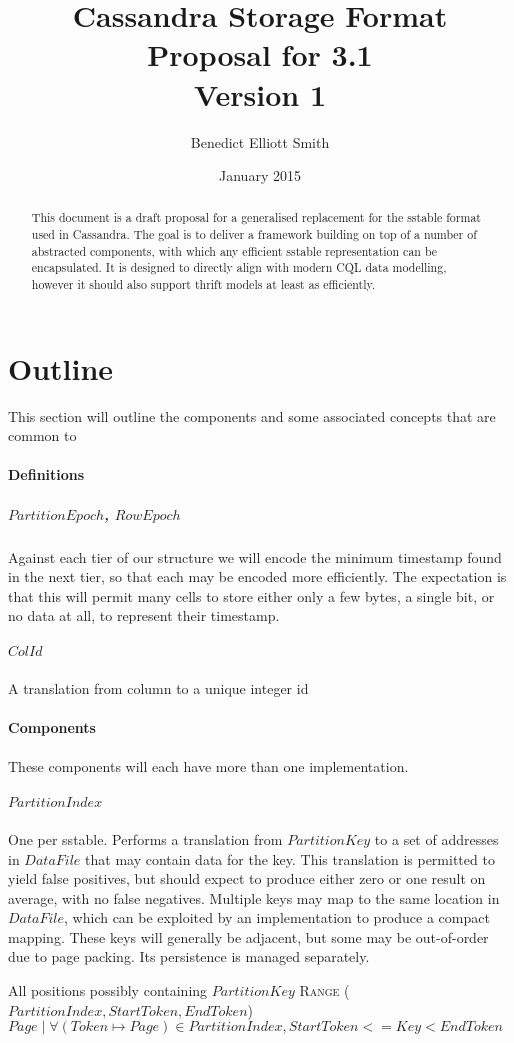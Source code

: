 \documentclass[fleqn]{article}
\title{Cassandra Storage Format\\Proposal for 3.1\\Version 1}
\author{Benedict Elliott Smith}
\date{January 2015}
\begin{document}
\maketitle

\begin{abstract}
This document is a draft proposal for a generalised replacement for the sstable format used in Cassandra.
The goal is to deliver a framework building on top of a number of abstracted components, with which
any efficient sstable representation can be encapsulated. It is designed to directly align with modern CQL
data modelling, however it should also support thrift models at least as efficiently.
\end{abstract}

\small

\section{Outline}
This section will outline the components and some associated concepts that are common to
\\
\paragraph{Definitions}
\subparagraph{$PartitionEpoch$, $RowEpoch$}
\subparagraph{}
    Against each tier of our structure we will encode the minimum timestamp found in the next
    tier, so that each may be encoded more efficiently. The expectation is that this will permit 
    many cells to store either only a few bytes, a single bit, or no data at all, to represent their timestamp.
\subparagraph{$ColId$}
\subparagraph{}
    A translation from column to a unique integer id

\paragraph{Components}
\paragraph{}
These components will each have more than one implementation.
\subparagraph{$PartitionIndex$}
\subparagraph{}
    One per sstable.
    Performs a translation from $PartitionKey$ to a set of addresses in $DataFile$ that may contain
    data for the key. This translation is permitted to yield false positives, but should
    expect to produce either zero or one result on average, with no false negatives.
    Multiple keys may map to the same location in $DataFile$, which can be exploited by an implementation
    to produce a compact mapping. These keys will generally be adjacent, but some may be out-of-order
    due to page packing. Its persistence is managed separately.
    \\
    \begin{algorithmic}[2]
    \scriptsize
    \Statex \Return All positions possibly containing $PartitionKey$
    \EndFunction
     \textsc{Range} ({$PartitionIndex, StartToken, EndToken$})
    \Statex \Return ${Page \mid \forall (Token \mapsto Page) \in PartitionIndex, StartToken <= Key < EndToken }$
    \end{algorithmic}
\end{document}

